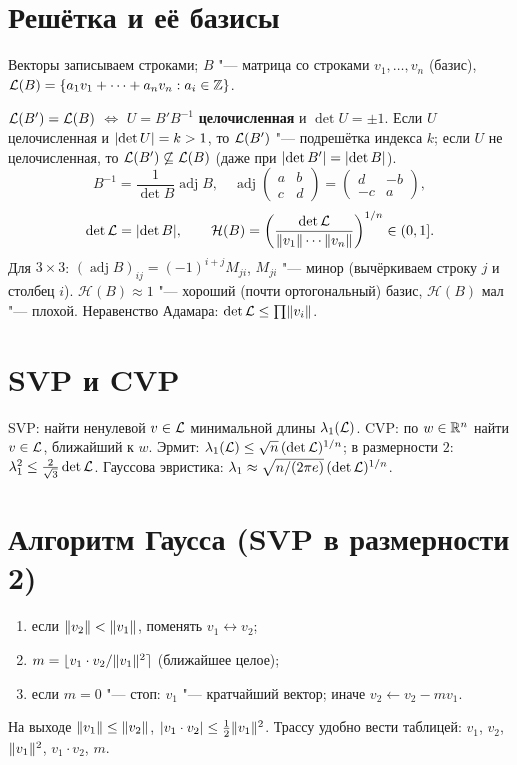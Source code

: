 \documentclass{ca-handout}
\begin{document}
\makehandouttitle

\section{Решётка и её базисы}
Векторы записываем строками; $B$ "--- матрица со строками $v_1, \dots, v_n$ (базис),
$\mathcal{L}(B) = \{a_1 v_1 + \cdots + a_n v_n : a_i \in \mathbb{Z}\}$.

\begin{reminder}[title={Смена базиса, определитель, коэффициент Адамара}]
$\mathcal{L}(B') = \mathcal{L}(B)$ $\iff$ $U = B'B^{-1}$ \textbf{целочисленная} и $\det U = \pm 1$.
Если $U$ целочисленная и $\lvert\det U\rvert = k > 1$, то $\mathcal{L}(B')$ "--- подрешётка индекса $k$; если
$U$ не целочисленная, то $\mathcal{L}(B') \not\subseteq \mathcal{L}(B)$ (даже при $\lvert\det B'\rvert = \lvert\det B\rvert$).
\[
  B^{-1} = \frac{1}{\det B}\operatorname{adj} B, \quad
  \operatorname{adj}\begin{pmatrix} a & b \\ c & d\end{pmatrix} = \begin{pmatrix} d & -b \\ -c & a\end{pmatrix},
\]
\[
  \det \mathcal{L} = \lvert\det B\rvert, \qquad
  \mathcal H(B) = \left(\frac{\det \mathcal{L}}{\lVert v_1\rVert\cdots\lVert v_n\rVert}\right)^{1/n} \in (0, 1].
\]
Для $3 \times 3$: $(\operatorname{adj} B)_{ij} = (-1)^{i+j} M_{ji}$, $M_{ji}$ "--- минор
(вычёркиваем строку $j$ и столбец $i$). $\mathcal H(B) \approx 1$ "--- хороший (почти
ортогональный) базис, $\mathcal H(B)$ мал "--- плохой. Неравенство Адамара:
$\det \mathcal{L} \le \prod \lVert v_i\rVert$.
\end{reminder}

\section{SVP и CVP}
SVP: найти ненулевой $v \in \mathcal{L}$ минимальной длины $\lambda_1(\mathcal{L})$. CVP: по $w \in \mathbb{R}^n$
найти $v \in \mathcal{L}$, ближайший к $w$. Эрмит: $\lambda_1(\mathcal{L}) \le \sqrt n\,(\det\mathcal{L})^{1/n}$;
в размерности $2$: $\lambda_1^2 \le \frac{2}{\sqrt3}\det\mathcal{L}$. Гауссова эвристика:
$\lambda_1 \approx \sqrt{n/(2\pi e)}\,(\det \mathcal{L})^{1/n}$.

\section{Алгоритм Гаусса (SVP в размерности 2)}
\begin{reminder}[title={Повторять, пока $m \ne 0$}]
\begin{enumerate}
  \item если $\lVert v_2\rVert < \lVert v_1\rVert$, поменять $v_1 \leftrightarrow v_2$;
  \item $m = \lfloor v_1 \cdot v_2 / \lVert v_1\rVert^2\rceil$ (ближайшее целое);
  \item если $m = 0$ "--- стоп: $v_1$ "--- кратчайший вектор; иначе $v_2 \gets v_2 - m v_1$.
\end{enumerate}
На выходе $\lVert v_1\rVert \le \lVert v_2\rVert$, $\lvert v_1 \cdot v_2\rvert \le \frac12\lVert v_1\rVert^2$. Трассу удобно
вести таблицей: $v_1$, $v_2$, $\lVert v_1\rVert^2$, $v_1 \cdot v_2$, $m$.
\end{reminder}
\end{document}

